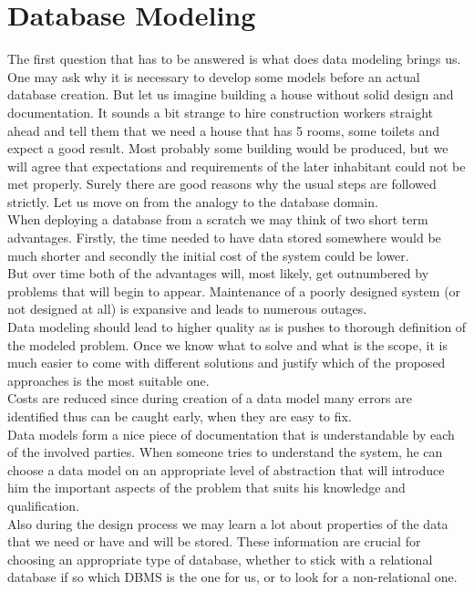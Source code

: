 \chapter{Database Modeling}

The first question that has to be answered is what does data modeling brings us. \\

One may ask why it is necessary to develop some models before an actual database creation.
But let us imagine building a house without solid design and documentation. 
It sounds a bit strange to hire construction workers straight ahead and tell them that we need a house that has 5 rooms, some toilets and expect a good result. Most probably some building would be produced, but we will agree that expectations and requirements of the later inhabitant could not be met properly.
Surely there are good reasons why the usual steps are followed strictly.
Let us move on from the analogy to the database domain. \\
When deploying a database from a scratch we may think of two short term advantages. Firstly, the time needed to have data stored somewhere would be much shorter and secondly the initial cost of the system could be lower. \\
But over time both of the advantages will, most likely, get outnumbered by problems that will begin to appear. Maintenance of a poorly designed system (or not designed at all) is expansive and leads to numerous outages. \\

Data modeling should lead to higher quality as is pushes to thorough definition of the modeled problem. Once we know what to solve and what is the scope, it is much easier to come with different solutions and justify which of the proposed approaches is the most suitable one. \\

Costs are reduced since during creation of a data model many errors are identified thus can be caught early, when they are easy to fix. \\

Data models form a nice piece of documentation that is understandable by each of the involved parties. When someone tries to understand the system, he can choose a data model on an appropriate level of abstraction that will introduce him the important aspects of the problem that suits his knowledge and qualification. \\

Also during the design process we may learn a lot about properties of the data that we need or have and will be stored. These information are crucial for choosing an appropriate type of database, whether to stick with a relational database if so which DBMS is the one for us, or to look for a non-relational one. \\

